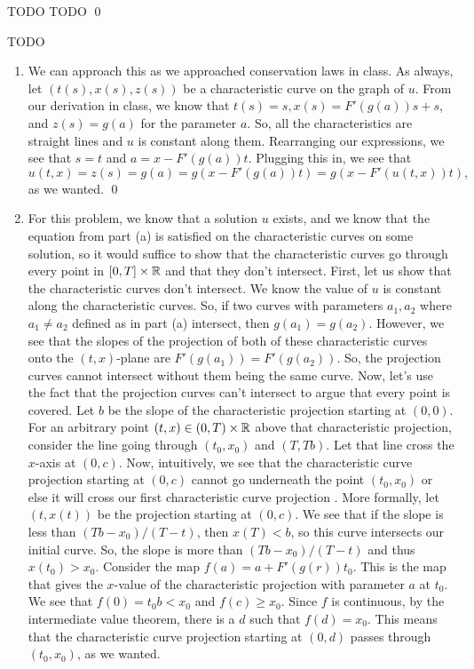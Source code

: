 \documentclass{article}
\begin{document}
\newpage
{} TODO
\hop
\solution
TODO \qed


\newpage
{} TODO
\hop
\solution
\begin{enumerate}
    \item We can approach this as we approached conservation laws in class. As always, let $(t(s), x(s), z(s))$ be a characteristic curve on the graph of $u$. From our derivation in class, we know that $t(s) = s, x(s)= F'(g(a))s + s$, and $z(s) = g(a)$ for the parameter $a$. So, all the characteristics are straight lines and $u$ is constant along them. Rearranging our expressions, we see that $s = t$ and $a = x - F'(g(a))t$. Plugging this in, we see that 
    \[u(t,x) = z(s) = g(a) = g(x - F'(g(a))t) = g(x - F'(u(t,x))t),\]
    as we wanted.  \qed
    \item For this problem, we know that a solution $u$ exists, and we know that the equation from part (a) is satisfied on the characteristic curves on some solution, so it would suffice to show that the characteristic curves go through every point in $[0,T] \times \mathbb{R}$ and that they don't intersect. 
    \hop
    First, let us show that the characteristic curves don't intersect. We know the value of $u$ is constant along the characteristic curves. So, if two curves with parameters $a_1, a_2$ where $a_1 \ne a_2$ defined as in part (a) intersect, then $g(a_1) = g(a_2)$. However, we see that the slopes of the projection of both of these characteristic curves onto the $(t,x)$-plane are  $F'(g(a_1)) = F'(g(a_2))$. So, the projection curves cannot intersect without them being the same curve.
    \hop 
    Now, let's use the fact that the projection curves can't intersect to argue that every point is covered. Let $b$ be the slope of the characteristic projection starting at $(0,0)$. For an arbitrary point $(t,x) \in (0,T) \times \mathbb{R}$ above that characteristic projection, consider the line going through $(t_0,x_0)$ and $(T,Tb)$. Let that line cross the $x$-axis at $(0,c)$. Now, intuitively, we see that the characteristic curve projection starting at $(0,c)$ cannot go underneath the point $(t_0,x_0)$ or else it will cross our first characteristic curve projection . More formally, let $(t,x(t))$ be the projection starting at $(0,c)$. We see that if the slope is less than $(Tb-x_0)/(T-t)$, then $x(T) < b$, so this curve intersects our initial curve. So, the slope is more than $(Tb-x_0)/(T-t)$ and thus $x(t_0) > x_0$. 
    \hop 
    Consider the map $f(a) = a + F'(g(r))t_0$. This is the map that gives the $x$-value of the characteristic projection with parameter $a$ at $t_0$. We see that $f(0) = t_0b < x_0$ and $f(c) \ge x_0$. Since $f$ is continuous, by the intermediate value theorem, there is a $d$ such that $f(d) = x_0$. This means that the characteristic curve projection starting at $(0,d)$ passes through $(t_0,x_0)$, as we wanted. 

\end{enumerate}
\end{document}

